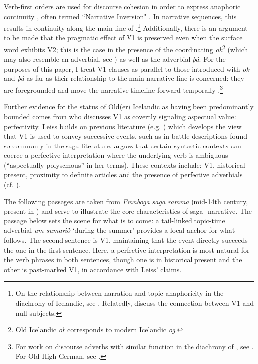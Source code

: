 \documentclass[output=paper,colorlinks,citecolor=brown]{langscibook}
\begin{document}
Verb-first orders are used for discourse cohesion in order to express anaphoric continuity \citep{booth-beck20200jhs}, often termed ``Narrative Inversion" \citep{Platzack1985}. In narrative sequences, this results in continuity along the main line of .\footnote{On the relationship between narration and topic anaphoricity in the diachrony of Icelandic, see \citet[20]{booth-beck20200jhs}. Relatedly, \citet{Kinn2016NullSubjects} discuss the connection between V1 and null subjects.} Additionally, there is an argument to be made that the pragmatic effect of V1 is preserved even when the surface word exhibits V2; this is the case in the presence of the coordinating  \textit{ok}\footnote{Old Icelandic \textit{ok} corresponds to modern Icelandic \textit{og}.} (which may also resemble an adverbial, see \cite{nielsen2017remark}) as well as the adverbial \textit{þá}. For the purposes of this paper, I treat V1 clauses as parallel to those introduced with \textit{ok} and \textit{þá} as far as their relationship to the main narrative line is concerned: they are foregrounded and move the narrative timeline forward temporally \citep{endersverbets, donhauser2006informationsstruktur}.\footnote{For work on discourse adverbs with similar function in the diachrony of , see \citet{vanKem-Los2006}. For Old High German, see \citet{trips2009syntax}.}

Further evidence for the status of Old(er) Icelandic as having been predominantly bounded comes from \citet{leiss2000artikel} who discusses V1 as covertly signaling aspectual value: perfectivity. Leiss builds on previous literature (e.g. \cite{rieger1966spitzenstellung, kossuth1980linguistic}) which develops the view that V1 is used to convey successive events, such as in battle descriptions found so commonly in the saga literature. \citet[95]{leiss2000artikel} argues that certain syntactic contexts can coerce a perfective interpretation where the underlying verb is ambiguous (``aspectually polysemous'' in her terms). These contexts include: V1, historical present, proximity to definite articles and the presence of perfective adverbials (cf. \cite{richardson1995tense}).

The following passages are taken from \textit{Finnboga saga ramma} (mid-14th century, present in ) and serve to illustrate the core characteristics of saga-  narrative. The passage below sets the scene for what is to come: a tail-linked topic-time adverbial \textit{um sumarið} `during the summer' provides a local anchor for what follows. The second sentence is V1, maintaining that the event directly succeeds the one in the first sentence. Here, a perfective interpretation is most natural for the verb phrases in both sentences, though one is in historical present and the other is past-marked V1, in accordance with Leiss' claims.
\end{document}
